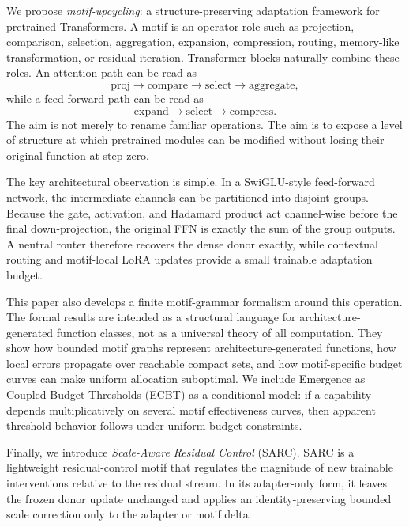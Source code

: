 \documentclass[11pt]{article}
\theoremstyle{definition}
\begin{document}
We propose \emph{motif-upcycling}: a structure-preserving adaptation framework for pretrained Transformers. A motif is an operator role such as projection, comparison, selection, aggregation, expansion, compression, routing, memory-like transformation, or residual iteration. Transformer blocks naturally combine these roles. An attention path can be read as
\[
  \mathrm{proj}\rightarrow \mathrm{compare}\rightarrow \mathrm{select}\rightarrow \mathrm{aggregate},
\]
while a feed-forward path can be read as
\[
  \mathrm{expand}\rightarrow \mathrm{select}\rightarrow \mathrm{compress}.
\]
The aim is not merely to rename familiar operations. The aim is to expose a level of structure at which pretrained modules can be modified without losing their original function at step zero.

The key architectural observation is simple. In a SwiGLU-style feed-forward network, the intermediate channels can be partitioned into disjoint groups. Because the gate, activation, and Hadamard product act channel-wise before the final down-projection, the original FFN is exactly the sum of the group outputs. A neutral router therefore recovers the dense donor exactly, while contextual routing and motif-local LoRA updates provide a small trainable adaptation budget.

This paper also develops a finite motif-grammar formalism around this operation. The formal results are intended as a structural language for architecture-generated function classes, not as a universal theory of all computation. They show how bounded motif graphs represent architecture-generated functions, how local errors propagate over reachable compact sets, and how motif-specific budget curves can make uniform allocation suboptimal. We include Emergence as Coupled Budget Thresholds (ECBT) as a conditional model: if a capability depends multiplicatively on several motif effectiveness curves, then apparent threshold behavior follows under uniform budget constraints.

Finally, we introduce \emph{Scale-Aware Residual Control} (SARC). SARC is a lightweight residual-control motif that regulates the magnitude of new trainable interventions relative to the residual stream. In its adapter-only form, it leaves the frozen donor update unchanged and applies an identity-preserving bounded scale correction only to the adapter or motif delta.
\end{document}

